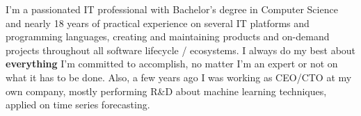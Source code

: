 
\begin{cvparagraph}
I'm a passionated IT professional with Bachelor's degree in Computer Science and nearly 18 years 
of practical experience on several IT platforms and programming languages, creating and maintaining
products and on-demand projects throughout all software lifecycle / ecosystems.
I always do my best about \textbf{everything} I'm committed to accomplish, no matter I'm an expert
or not on what it has to be done. Also, a few years ago I was working as CEO/CTO at my own company,
mostly performing  R\&D about machine learning techniques, applied on time series forecasting.
\end{cvparagraph}
